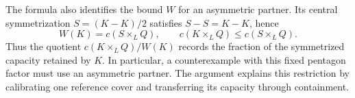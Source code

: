The formula also identifies the bound $W$ for an asymmetric partner.
Its central symmetrization $S=(K-K)/2$ satisfies $S-S=K-K$, hence
\[
 W(K)=c(S\times_L Q),\qquad c(K\times_L Q)\le c(S\times_L Q).
\]
Thus the quotient $c(K\times_L Q)/W(K)$ records the fraction of the
symmetrized capacity retained by $K$.
In particular, a counterexample with this fixed pentagon factor must use
an asymmetric partner. The argument explains this restriction by calibrating
one reference cover and transferring its capacity through containment.
